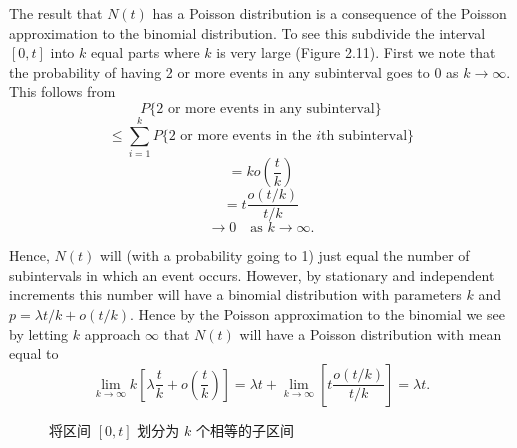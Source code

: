 \documentclass[lang=cn,10pt,thmcnt=section]{elegantbook}
\begin{document}
\begin{remark}

	The result that $N(t)$ has a Poisson distribution is a consequence of the Poisson approximation to the binomial distribution. To see this subdivide the interval $[0, t]$ into $k$ equal parts where $k$ is very large (Figure 2.11). First we note that the probability of having 2 or more events in any subinterval goes to 0 as $k \to \infty$. This follows from
\[
P\{2 \text{ or more events in any subinterval}\}
\]
\[
\leq \sum_{i=1}^{k} P\{2 \text{ or more events in the } i\text{th subinterval}\}
\]
\[
= k o\left(\frac{t}{k}\right)
\]
\[
= t \frac{o(t/k)}{t/k}
\]
\[
\to 0 \quad \text{as } k \to \infty.
\]
\end{remark}
Hence, $N(t)$ will (with a probability going to 1) just equal the number of subintervals in which an event occurs. However, by stationary and independent increments this number will have a binomial distribution with parameters $k$ and $p = \lambda t/k + o(t/k)$. Hence by the Poisson approximation to the binomial we see by letting $k$ approach $\infty$ that $N(t)$ will have a Poisson distribution with mean equal to
\[
\lim_{k \to \infty} k \left[ \lambda \frac{t}{k} + o\left(\frac{t}{k}\right) \right] = \lambda t + \lim_{k \to \infty} \left[ t \frac{o(t/k)}{t/k} \right] = \lambda t.
\]
\begin{figure}[h]
\centering
{}
\caption{将区间 \([0, t]\) 划分为 \(k\) 个相等的子区间}
\end{figure}
\end{document}
